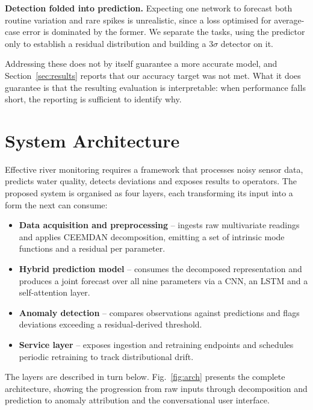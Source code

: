 \documentclass[conference]{IEEEtran}
\begin{document}
\textbf{Detection folded into prediction.} Expecting one network to forecast
both routine variation and rare spikes is unrealistic, since a loss optimised
for average-case error is dominated by the former. We separate the tasks, using
the predictor only to establish a residual distribution and building a
$3\sigma$ detector on it.

Addressing these does not by itself guarantee a more accurate model, and
Section~\ref{sec:results} reports that our accuracy target was not met. What it does guarantee
is that the resulting evaluation is interpretable: when performance falls
short, the reporting is sufficient to identify why.

\section{System Architecture}

Effective river monitoring requires a framework that processes noisy sensor
data, predicts water quality, detects deviations and exposes results to
operators. The proposed system is organised as four layers, each transforming
its input into a form the next can consume:

\begin{itemize}
\item \textbf{Data acquisition and preprocessing} -- ingests raw multivariate
      readings and applies CEEMDAN decomposition, emitting a set of intrinsic
      mode functions and a residual per parameter.
\item \textbf{Hybrid prediction model} -- consumes the decomposed
      representation and produces a joint forecast over all nine parameters via
      a CNN, an LSTM and a self-attention layer.
\item \textbf{Anomaly detection} -- compares observations against predictions
      and flags deviations exceeding a residual-derived threshold.
\item \textbf{Service layer} -- exposes ingestion and retraining endpoints and
      schedules periodic retraining to track distributional drift.
\end{itemize}

The layers are described in turn below. Fig.~\ref{fig:arch} presents the
complete architecture, showing the progression from raw inputs through
decomposition and prediction to anomaly attribution and the conversational user
interface.
\end{document}
